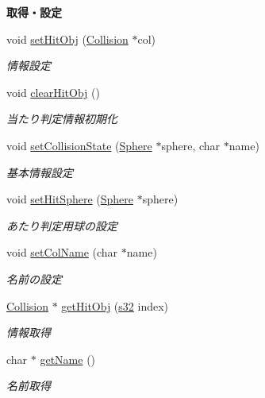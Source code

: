 \begin{Indent}{\bf 取得・設定}\par
\begin{DoxyCompactItemize}
\item 
void \hyperlink{class_collision_a5cd49ea00086ec5d80fd1de138bd37bc}{set\-Hit\-Obj} (\hyperlink{class_collision}{Collision} $\ast$col)
\begin{DoxyCompactList}\small\item\em 情報設定 \end{DoxyCompactList}\item 
void \hyperlink{class_collision_ab0af0476de0cf02a3e5396ec4bcee1fc}{clear\-Hit\-Obj} ()
\begin{DoxyCompactList}\small\item\em 当たり判定情報初期化 \end{DoxyCompactList}\item 
void \hyperlink{class_collision_afdb744ad8ba9ca0a69d54a24df6e3cb9}{set\-Collision\-State} (\hyperlink{struct_sphere}{Sphere} $\ast$sphere, char $\ast$name)
\begin{DoxyCompactList}\small\item\em 基本情報設定 \end{DoxyCompactList}\item 
void \hyperlink{class_collision_ae0aab4de405176b17857c67912703ded}{set\-Hit\-Sphere} (\hyperlink{struct_sphere}{Sphere} $\ast$sphere)
\begin{DoxyCompactList}\small\item\em あたり判定用球の設定 \end{DoxyCompactList}\item 
void \hyperlink{class_collision_acb2f78d670bc686d7ed2a46d463f9635}{set\-Col\-Name} (char $\ast$name)
\begin{DoxyCompactList}\small\item\em 名前の設定 \end{DoxyCompactList}\item 
\hyperlink{class_collision}{Collision} $\ast$ \hyperlink{class_collision_aef63d97ae632428052221cea0ca5bb5a}{get\-Hit\-Obj} (\hyperlink{_main_8h_a0ce6887c26c1c49ad3be5710dd42bfd6}{s32} index)
\begin{DoxyCompactList}\small\item\em 情報取得 \end{DoxyCompactList}\item 
char $\ast$ \hyperlink{class_collision_a53cac61e9a7e0d9706a53673de3e163f}{get\-Name} ()
\begin{DoxyCompactList}\small\item\em 名前取得 \end{DoxyCompactList}\item 

\end{DoxyCompactItemize}
\end{Indent}
